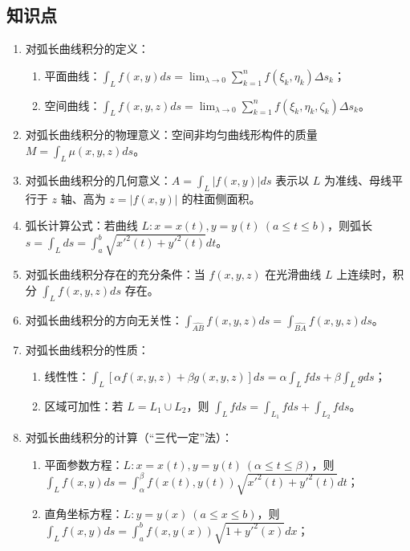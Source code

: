 \documentclass[UTF8]{ctexart}
\theoremstyle{remark}
\begin{document}
	\subsection*{知识点}
		\begin{enumerate}
			\item 对弧长曲线积分的定义：
			\begin{enumerate}
				\item 平面曲线：\(\int_{L} f(x, y) ds = \lim_{\lambda \to 0} \sum_{k=1}^{n} f(\xi_k, \eta_k) \Delta s_k\)；
				\item 空间曲线：\(\int_{L} f(x, y, z) ds = \lim_{\lambda \to 0} \sum_{k=1}^{n} f(\xi_k, \eta_k, \zeta_k) \Delta s_k\)。
			\end{enumerate}
			\item 对弧长曲线积分的物理意义：空间非均匀曲线形构件的质量 \(M = \int_{L} \mu(x, y, z) ds\)。
			\item 对弧长曲线积分的几何意义：\(A = \int_{L} |f(x, y)| ds\) 表示以 \(L\) 为准线、母线平行于 \(z\) 轴、高为 \(z = |f(x, y)|\) 的柱面侧面积。
			\item 弧长计算公式：若曲线 \(L: x = x(t), y = y(t) \ (a \leq t \leq b)\)，则弧长 \(s = \int_{L} ds = \int_{a}^{b} \sqrt{x'^2(t) + y'^2(t)} dt\)。
			\item 对弧长曲线积分存在的充分条件：当 \(f(x, y, z)\) 在光滑曲线 \(L\) 上连续时，积分 \(\int_{L} f(x, y, z) ds\) 存在。
			\item 对弧长曲线积分的方向无关性：\(\int_{\widehat{AB}} f(x, y, z) ds = \int_{\widehat{BA}} f(x, y, z) ds\)。
			\item 对弧长曲线积分的性质：
			\begin{enumerate}
				\item 线性性：\(\int_{L}[\alpha f(x, y, z) + \beta g(x, y, z)] ds = \alpha \int_{L} f ds + \beta \int_{L} g ds\)；
				\item 区域可加性：若 \(L = L_1 \cup L_2\)，则 \(\int_{L} f ds = \int_{L_1} f ds + \int_{L_2} f ds\)。
			\end{enumerate}
			\item 对弧长曲线积分的计算（“三代一定”法）：
			\begin{enumerate}
				\item 平面参数方程：\(L: x = x(t), y = y(t) \ (\alpha \leq t \leq \beta)\)，则 \(\int_{L} f(x, y) ds = \int_{\alpha}^{\beta} f(x(t), y(t)) \sqrt{x'^2(t) + y'^2(t)} dt\)；
				\item 直角坐标方程：\(L: y = y(x) \ (a \leq x \leq b)\)，则 \(\int_{L} f(x, y) ds = \int_{a}^{b} f(x, y(x)) \sqrt{1 + y'^2(x)} dx\)；

\end{enumerate}
\end{enumerate}
\end{document}
